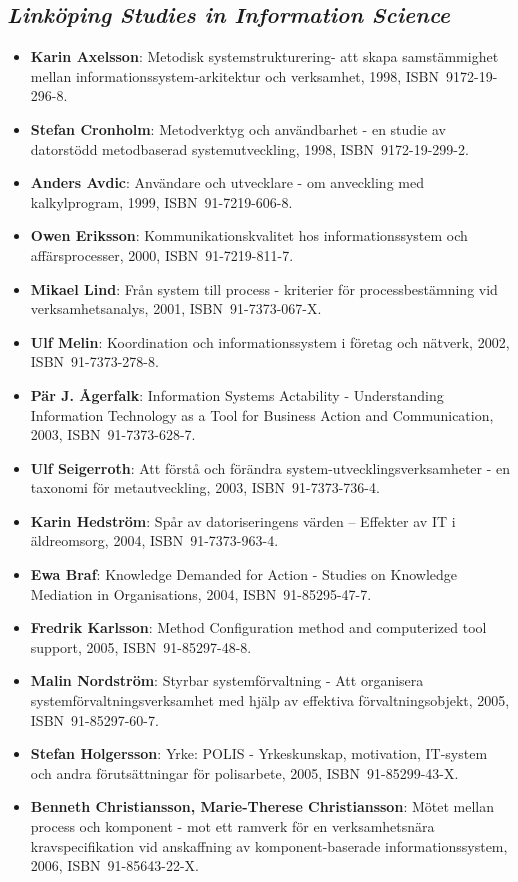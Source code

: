 \documentclass[a4paper,showtrims,twocolumn]{memoir}
\newcommand{\subseries}[1]{\subsection*{\footnotesize\normalfont\textit{#1}}}
\newenvironment{theses}{
  \begin{itemize}
    \setlength{\itemsep}{0.2em}
    \setlength{\parskip}{0em}
    \setlength{\parsep}{0em}
}{
  \end{itemize}
}
\newcommand{\thesis}[5]{\item[No. #1] \textbf{#2}: #3, #4, ISBN~#5.}
\begin{document}
  \subseries{Linköping Studies in Information Science}

  \begin{theses}
    \thesis{1}{Karin Axelsson}{Metodisk systemstrukturering- att skapa samstämmighet mellan informationssystem-arkitektur och verksamhet}{1998}{9172-19-296-8}
    \thesis{2}{Stefan Cronholm}{Metodverktyg och användbarhet - en studie av datorstödd metodbaserad systemutveckling}{1998}{9172-19-299-2}
    \thesis{3}{Anders Avdic}{Användare och utvecklare - om anveckling med kalkylprogram}{1999}{91-7219-606-8}
    \thesis{4}{Owen Eriksson}{Kommunikationskvalitet hos informationssystem och affärsprocesser}{2000}{91-7219-811-7}
    \thesis{5}{Mikael Lind}{Från system till process - kriterier för processbestämning vid verksamhetsanalys}{2001}{91-7373-067-X}
    \thesis{6}{Ulf Melin}{Koordination och informationssystem i företag och nätverk}{2002}{91-7373-278-8}
    \thesis{7}{Pär J. Ågerfalk}{Information Systems Actability - Understanding Information Technology as a Tool for Business Action and Communication}{2003}{91-7373-628-7}
    \thesis{8}{Ulf Seigerroth}{Att förstå och förändra system-utvecklingsverksamheter - en taxonomi för metautveckling}{2003}{91-7373-736-4}
    \thesis{9}{Karin Hedström}{Spår av datoriseringens värden – Effekter av IT i äldreomsorg}{2004}{91-7373-963-4}
    \thesis{10}{Ewa Braf}{Knowledge Demanded for Action - Studies on Knowledge Mediation in Organisations}{2004}{91-85295-47-7}
    \thesis{11}{Fredrik Karlsson}{Method Configuration method and computerized tool support}{2005}{91-85297-48-8}
    \thesis{12}{Malin Nordström}{Styrbar systemförvaltning - Att organisera systemförvaltningsverksamhet med hjälp av effektiva förvaltningsobjekt}{2005}{91-85297-60-7}
    \thesis{13}{Stefan Holgersson}{Yrke: POLIS - Yrkeskunskap, motivation, IT-system och andra förutsättningar för polisarbete}{2005}{91-85299-43-X}
    \thesis{14}{Benneth Christiansson, Marie-Therese Christiansson}{Mötet mellan process och komponent - mot ett ramverk för en verksamhetsnära kravspecifikation vid anskaffning av komponent-baserade informationssystem}{2006}{91-85643-22-X}
  \end{theses}
\end{document}

